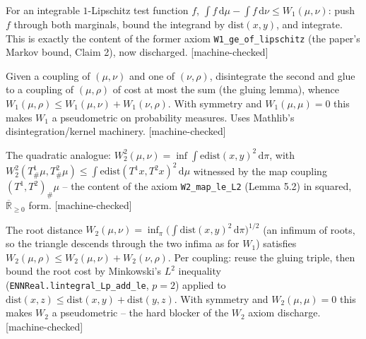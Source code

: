 \begin{lemma}\label{found:kr}\leanok
For an integrable $1$-Lipschitz test function $f$, $\int f\,\mathrm d\mu - \int f\,\mathrm d\nu \le
W_1(\mu,\nu)$: push $f$ through both marginals, bound the integrand by $\mathrm{dist}(x,y)$, and integrate.
This is exactly the content of the former axiom \texttt{W1\_ge\_of\_lipschitz} (the paper's Markov bound,
Claim 2), now discharged. [machine-checked]
\end{lemma}

\begin{lemma}\label{found:w1tri}\leanok
Given a coupling of $(\mu,\nu)$ and one of $(\nu,\rho)$, disintegrate the second and glue to a coupling of
$(\mu,\rho)$ of cost at most the sum (the gluing lemma), whence $W_1(\mu,\rho)\le W_1(\mu,\nu)+W_1(\nu,\rho)$.
With symmetry and $W_1(\mu,\mu)=0$ this makes $W_1$ a pseudometric on probability measures. Uses Mathlib's
disintegration/kernel machinery. [machine-checked]
\end{lemma}

\begin{lemma}\label{found:w2map}\leanok
The quadratic analogue: $W_2^2(\mu,\nu) = \inf \int \mathrm{edist}(x,y)^2\,\mathrm d\pi$, with
$W_2^2(T^1_\#\mu, T^2_\#\mu) \le \int \mathrm{edist}(T^1 x, T^2 x)^2\,\mathrm d\mu$ witnessed by the map
coupling $(T^1,T^2)_\#\mu$ -- the content of the axiom \texttt{W2\_map\_le\_L2} (Lemma 5.2) in squared,
$\overline{\mathbb R}_{\ge 0}$ form. [machine-checked]
\end{lemma}

\begin{lemma}\label{found:w2tri}\leanok
The root distance $W_2(\mu,\nu) = \inf_\pi \big(\int \mathrm{dist}(x,y)^2\,\mathrm d\pi\big)^{1/2}$ (an
infimum of roots, so the triangle descends through the two infima as for $W_1$) satisfies
$W_2(\mu,\rho) \le W_2(\mu,\nu) + W_2(\nu,\rho)$. Per coupling: reuse the gluing triple, then bound the
root cost by Minkowski's $L^2$ inequality (\texttt{ENNReal.lintegral\_Lp\_add\_le}, $p=2$) applied to
$\mathrm{dist}(x,z) \le \mathrm{dist}(x,y)+\mathrm{dist}(y,z)$. With symmetry and $W_2(\mu,\mu)=0$ this
makes $W_2$ a pseudometric -- the hard blocker of the $W_2$ axiom discharge. [machine-checked]
\end{lemma}

